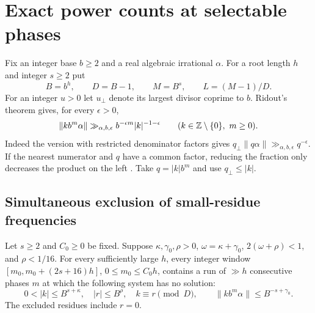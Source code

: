 \section{Exact power counts at selectable phases}\label{sec:phase-counts}

Fix an integer base \(b\ge2\) and a real algebraic irrational \(\alpha\).
For a root length \(h\) and integer \(s\ge2\) put
\[
 B=b^h,\qquad D=B-1,\qquad M=B^s,\qquad L=(M-1)/D.
\]
For an integer \(u>0\) let \(u_\perp\) denote its largest divisor coprime
to \(b\). Ridout's theorem gives, for every \(\epsilon>0\),
\begin{equation}\label{eq:phase-ridout}
 \|k b^m\alpha\|\gg_{\alpha,b,\epsilon}
               b^{-\epsilon m}|k|^{-1-\epsilon}
 \qquad (k\in\mathbb Z\setminus\{0\},\ m\ge0).
\end{equation}
Indeed the version with restricted denominator factors gives
\(q_\perp\|q\alpha\|\gg_{\alpha,b,\epsilon}q^{-\epsilon}\).
If the nearest numerator and \(q\) have a common factor, reducing the
fraction only decreases the product on the left
\cite{RidoutPadic}. Take \(q=|k|b^m\) and use \(q_\perp\le |k|\).

\subsection{Simultaneous exclusion of small-residue frequencies}

\begin{lemma}\label{lem:phase-residue}
Let \(s\ge2\) and \(C_0\ge0\) be fixed. Suppose
\(\kappa,\gamma_0,\rho>0\), \(\omega=\kappa+\gamma_0\),
\(2(\omega+\rho)<1\), and \(\rho<1/16\). For every sufficiently large
\(h\), every integer window
\([m_0,m_0+(2s+16)h]\), \(0\le m_0\le C_0h\), contains a run of
\(\gg h\) consecutive phases \(m\) at which the following system has
no solution:
\begin{equation}\label{eq:phase-bad}
 0<|k|\le B^{s+\kappa},\quad |r|\le B^\rho,\quad k\equiv r\pmod D,
 \qquad \|k b^m\alpha\|\le B^{-s+\gamma_0}.
\end{equation}
The excluded residues include \(r=0\).
\end{lemma}

